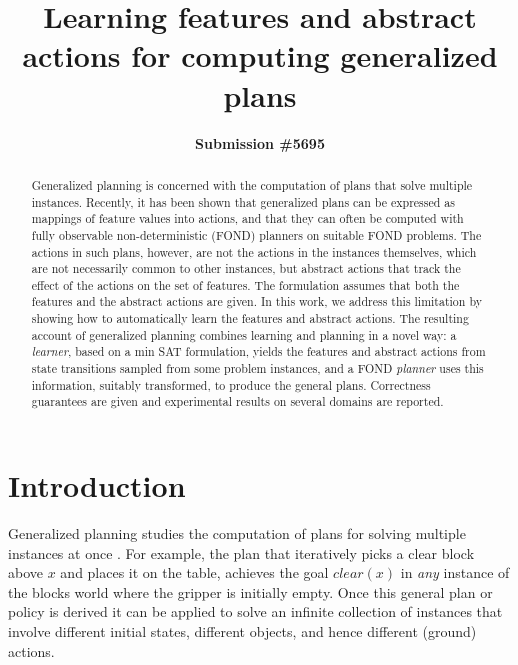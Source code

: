 \documentclass[letterpaper]{article} %
\title{Learning features and abstract actions for computing generalized plans}
\author{\textbf{Submission \#5695}}
\begin{document}
\maketitle

\begin{abstract}
  Generalized planning is concerned with the computation of plans that solve multiple instances.
  Recently, it has been shown that generalized plans can be expressed as mappings of feature
  values into actions, and that they can often be computed with fully observable non-deterministic
  (FOND) planners on suitable FOND problems. %
  The actions in such plans, however, are not the actions in the instances themselves, which are
  not necessarily common to  other instances, but abstract actions that track the effect of the
  actions on the set of features. The formulation assumes that both the features and the abstract
  actions are given.
  In this work, we address this limitation by showing how to automatically learn the features and
  abstract actions. The resulting account of generalized planning combines learning and planning
  in a novel way: a \emph{learner}, based on a min SAT formulation, yields the features and abstract
  actions from state transitions sampled from some problem instances, and a FOND \emph{planner}
  uses this information, suitably transformed, to produce the general plans.
  Correctness guarantees are given and experimental results on several domains are reported.
\end{abstract}



\section{Introduction}

Generalized planning studies the computation of plans for  solving  multiple  instances at once
\cite{srivastava08learning,bonet09automatic,srivastava:generalized,hu:generalized,BelleL16,anders:generalized}.
For example, the plan  that iteratively  picks  a  clear block above $x$ 
and places it  on the table, achieves the goal $clear(x)$
in \emph{any} instance of the blocks world where the gripper is initially empty.
Once this  general plan or  policy is derived it can be  applied to solve an infinite collection
of instances that involve different initial states, different objects, and hence  different (ground)  actions. 
\end{document}
